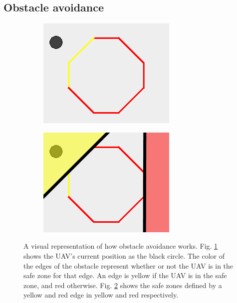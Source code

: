 \subsection{Obstacle avoidance}
\begin{figure}[!t]
    \centering
    
    \begin{subfigure}[t]{0.35\columnwidth}
        \includegraphics[width=\textwidth]{img/obs1c}
        \caption{}
        \label{fig:obs-clear}
    \end{subfigure}
    \begin{subfigure}[t]{0.35\columnwidth}
        \includegraphics[width=\textwidth]{img/obs2c}
        \caption{}
        \label{fig:obs-regions}
    \end{subfigure}
    \caption{A visual representation of how obstacle avoidance works. Fig. \ref{fig:obs-clear} shows the UAV's current position as the black circle. The color of the edges of the obstacle represent whether or not the UAV is in the safe zone for that edge. An edge is yellow if the UAV is in the safe zone, and red otherwise. Fig. \ref{fig:obs-regions} shows the safe zones defined by a yellow and red edge in yellow and red respectively. }\label{fig:obs}
\end{figure}
